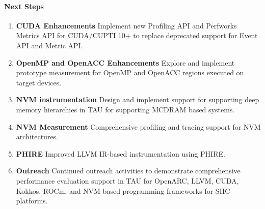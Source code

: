 \paragraph{Next Steps}
\begin{enumerate}
\item \textbf{CUDA Enhancements} 
Implement new Profiling API and Perfworks Metrics API for CUDA/CUPTI 10+ to replace deprecated support for Event API and Metric API.

\item \textbf{OpenMP and OpenACC Enhancements} 
Explore and implement prototype measurement for OpenMP and OpenACC regions executed on target devices.

\item \textbf{NVM instrumentation} 
Design and implement support for supporting deep memory hierarchies in TAU for supporting MCDRAM based systems. 

\item \textbf{NVM Measurement} 
Comprehensive profiling and tracing support for NVM architectures.

\item \textbf{PHIRE} 
Improved LLVM IR-based instrumentation using PHIRE.

\item \textbf{Outreach}
Continued outreach activities to demonstrate comprehensive performance evaluation support in TAU for OpenARC, LLVM, CUDA, Kokkos, ROCm, and NVM based programming frameworks for SHC platforms. 
\end{enumerate}
